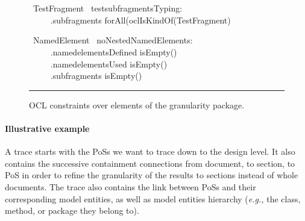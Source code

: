 \begin{figure}[h]
\begin{ocl}[0.85\linewidth]
\vspace{0.3truecm}\OCLcontext~TestFragment \OCLinv ~testsubfragmentsTyping: 
\\ \verb+     +\OCLself.subfragments \OCLarrow forAll(\OCLself \OCLarrow oclIsKindOf(TestFragment)


\vspace{0.3truecm}\OCLcontext~NamedElement \OCLinv ~noNestedNamedElements: 
\\ \verb+     +\OCLself.namedelementsDefined \OCLarrow isEmpty()  \OCLand
\\ \verb+     +\OCLself.namedelementsUsed \OCLarrow isEmpty() \OCLand
\\ \verb+     +\OCLself.subfragments \OCLarrow isEmpty() 
\end{ocl}

\vspace{0.4truecm}
\rule{0.9\linewidth}{1pt}
\vspace{-0.2truecm}

\caption{OCL constraints over elements of the granularity package.}
\label{fig:ocl-granularity}
\vspace{-0.6truecm}
\end{figure}


\paragraph{Illustrative example}%

A trace starts with the PoSs we want to trace down to the design level. It also contains the successive containment connections from document, to section, to PoS in order to refine the granularity of the results to sections instead of whole documents. The trace also contains the link between PoSs and their corresponding model entities, as well as model entities hierarchy (\textit{e.g.,} the class, method, or package they belong to).

